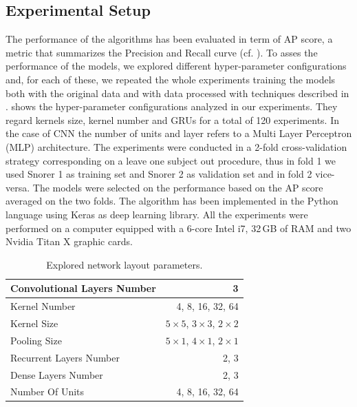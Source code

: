 \subsection{Experimental Setup}
The performance of the algorithms has been evaluated in term of AP score, a metric that summarizes the Precision and Recall curve (cf. ).
To asses the performance of the models, we explored different hyper-parameter configurations and, for each of these, we repeated the whole experiments training the models both with the original data and  with  data processed with techniques described in .  shows the hyper-parameter configurations analyzed in our experiments. They regard kernels size, kernel number and GRUs for a total of 120 experiments. In the case of CNN the number of units and layer refers to a Multi Layer Perceptron (MLP) architecture. The experiments were conducted in a 2-fold cross-validation strategy corresponding on a leave one subject out procedure, thus in fold 1 we used Snorer 1 as training set and Snorer 2 as validation set and in fold 2 vice-versa. The models were selected on the performance based on the AP score  averaged on the two folds. 
The algorithm has been implemented in the Python language using Keras \cite{chollet2015keras} as deep learning library. All the experiments were performed on a computer equipped with a 6-core Intel i7, 32\,GB of RAM and two Nvidia Titan X graphic cards. 

\begin{table}[ht]
	\centering
	\begin{tabular}{|l|r|}
		\hline
		Convolutional Layers Number & 3                            \\ \hline
		Kernel Number               & 4, 8, 16, 32, 64                 \\ \hline
		Kernel Size                 & $5\times5$, $3\times3$, $2\times2$ \\ \hline
		Pooling Size                & $5\times1$, $4\times1$, $2\times1$ \\ \hline
		\hline
		Recurrent Layers Number     & 2, 3                            \\ \hline
		Dense Layers Number     & 2, 3                            \\ \hline
		Number Of Units             & 4, 8, 16, 32, 64                 \\ \hline
	\end{tabular}
	\caption[Snoring Detection - Experiments]{Explored network layout parameters.}
	\label{CNN-params}
\end{table}


